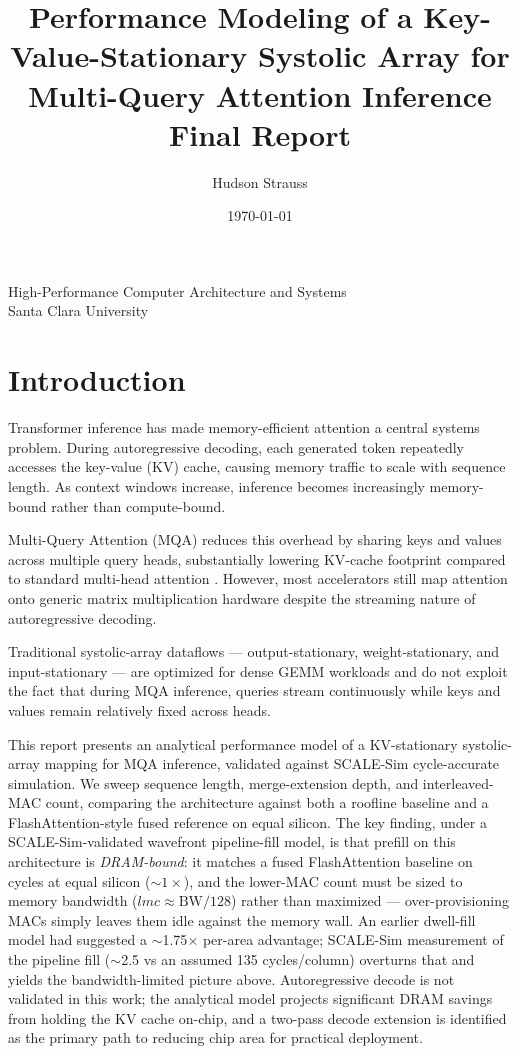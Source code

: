 \documentclass[11pt]{article}
\title{
\textbf{
Performance Modeling of a Key-Value-Stationary
Systolic Array for Multi-Query Attention Inference
}
\\[1ex]
\large Final Report
}
\author{
Hudson Strauss
}
\date{\today}
\begin{document}
\maketitle

\begin{center}
High-Performance Computer Architecture and Systems \\
Santa Clara University
\end{center}

\vspace{0.5em}

\section{Introduction}

Transformer inference has made memory-efficient attention a central
systems problem. During autoregressive decoding, each generated token
repeatedly accesses the key-value (KV) cache, causing memory traffic
to scale with sequence length. As context windows increase, inference
becomes increasingly memory-bound rather than compute-bound.

Multi-Query Attention (MQA) reduces this overhead by sharing keys and
values across multiple query heads, substantially lowering KV-cache
footprint compared to standard multi-head attention
\parencite{ainslie2023gqa}. However, most accelerators still map
attention onto generic matrix multiplication hardware despite the
streaming nature of autoregressive decoding.

Traditional systolic-array dataflows --- output-stationary,
weight-stationary, and input-stationary --- are optimized for
dense GEMM workloads and do not exploit the fact that during
MQA inference, queries stream continuously while keys and
values remain relatively fixed across heads.

This report presents an analytical performance model of a
KV-stationary systolic-array mapping for MQA inference,
validated against SCALE-Sim cycle-accurate simulation.
We sweep sequence length, merge-extension depth, and
interleaved-MAC count, comparing the architecture against
both a roofline baseline and a FlashAttention-style fused
reference on equal silicon.
The key finding, under a SCALE-Sim-validated wavefront pipeline-fill
model, is that prefill on this architecture is \emph{DRAM-bound}: it
matches a fused FlashAttention baseline on cycles at equal silicon
(\(\sim\!1\times\)), and the lower-MAC count must be sized to memory
bandwidth (\(lmc \approx \text{BW}/128\)) rather than maximized ---
over-provisioning MACs simply leaves them idle against the memory wall.
An earlier dwell-fill model had suggested a \(\sim\)1.75$\times$
per-area advantage; SCALE-Sim measurement of the pipeline fill
(\(\sim\)2.5 vs an assumed 135 cycles/column) overturns that and yields
the bandwidth-limited picture above.
Autoregressive decode is not validated in this work;
the analytical model projects significant DRAM savings
from holding the KV cache on-chip, and a two-pass decode
extension is identified as the primary path to reducing
chip area for practical deployment.
\end{document}
